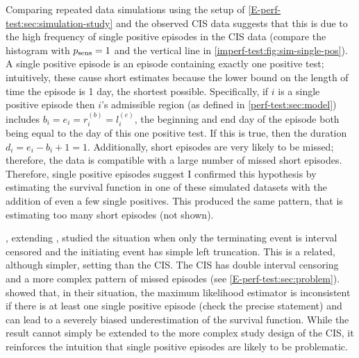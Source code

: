 \documentclass[thesis.tex]{subfiles}
\begin{document}
Comparing repeated data simulations using the setup of \cref{E-perf-test:sec:simulation-study} and the observed CIS data suggests that this is due to the high frequency of single positive episodes in the CIS data (compare the histogram with $p_\text{sens}=1$ and the vertical line in \cref{imperf-test:fig:sim-single-pos}).
A single positive episode is an episode containing exactly one positive test; intuitively, these cause short estimates because the lower bound on the length of time the episode is 1 day, the shortest possible.
Specifically, if $i$ is a single positive episode then $i$'s admissible region (as defined in \cref{perf-test:sec:model}) includes $b_i = e_i = r_i^{(b)} = l_i^{(e)}$, the beginning and end day of the episode both being equal to the day of this one positive test.
If this is true, then the duration $d_i = e_i - b_i + 1 = 1$.
Additionally, short episodes are very likely to be missed; therefore, the data is compatible with a large number of missed short episodes.
Therefore, single positive episodes suggest 
I confirmed this hypothesis by estimating the survival function in one of these simulated datasets with the addition of even a few single positives.
This produced the same pattern, that is estimating too many short episodes (not shown).

\Textcite{shenNonparametrica}, extending \textcite{panNote}, studied the situation when only the terminating event is interval censored and the initiating event has simple left truncation.
This is a related, although simpler, setting than the CIS.
The CIS has double interval censoring and a more complex pattern of missed episodes (see \cref{E-perf-test:sec:problem}).
\Textcite{shenNonparametrica} showed that, in their situation, the maximum likelihood estimator is inconsistent if there is at least one single positive episode (check the precise statement) and can lead to a severely biased underestimation of the survival function.
While the result cannot simply be extended to the more complex study design of the CIS, it reinforces the intuition that single positive episodes are likely to be problematic.
\end{document}
